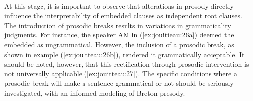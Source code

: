\documentclass[output=paper,colorlinks,citecolor=brown]{langscibook}
\begin{document}
\ea \label{ex:jouitteau:25}  \\
    \z
    \z

            
At this stage, it is important to observe that alterations in prosody directly influence the interpretability of embedded clauses as independent root clauses. The introduction of prosodic breaks results in variations in grammaticality judgments. For instance, the speaker AM in (\ref{ex:jouitteau:26a}) deemed the embedded  as ungrammatical. However, the inclusion of a prosodic break, as shown in example (\ref{ex:jouitteau:26b}), rendered it grammatically acceptable. It should be noted, however, that this rectification through prosodic intervention is not universally applicable (\ref{ex:jouitteau:27}). The specific conditions where a prosodic break will make a sentence grammatical or not should be seriously investigated, with an informed modeling of Breton prosody.
\end{document}
